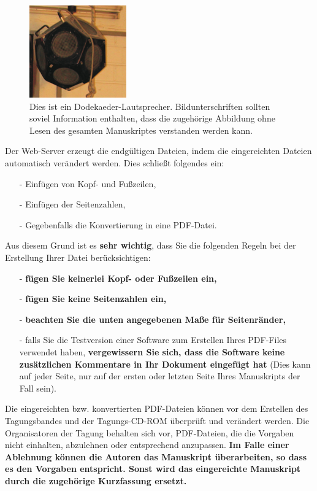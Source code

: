 \documentclass[a4paper, 10pt, twocolumn]{article}
\begin{document}
\begin{figure}[hbt]
    \begin{center}
        \includegraphics[width=4.2cm]{dode}
    \end{center}
    \caption{Dies ist ein Dodekaeder-Lautsprecher. Bildunterschriften sollten soviel Information enthalten, dass die zugehörige Abbildung ohne Lesen des gesamten Manuskriptes verstanden werden kann.}
    \label{fig:dode}
\end{figure}
Der Web-Server erzeugt die endgültigen Dateien, indem die eingereichten Dateien automatisch verändert werden. Dies schließt folgendes ein:
\begin{itemize}
    \item[-] Einfügen von Kopf- und Fußzeilen,
    \item[-] Einfügen der Seitenzahlen,
    \item[-] Gegebenfalls die Konvertierung in eine PDF-Datei.
\end{itemize}
Aus diesem Grund ist es \textbf{sehr wichtig}, dass Sie die folgenden Regeln bei der Erstellung Ihrer Datei berücksichtigen:
\begin{itemize}
    \item[-] \textbf{fügen Sie keinerlei Kopf- oder Fußzeilen ein,}
    \item[-] \textbf{fügen Sie keine Seitenzahlen ein,}
    \item[-] \textbf{beachten Sie die unten angegebenen Maße für Seitenränder,}
    \item[-] falls Sie die Testversion einer Software zum Erstellen Ihres PDF-Files verwendet haben, \textbf{vergewissern Sie sich, dass die Software keine
    zusätzlichen Kommentare in Ihr Dokument eingefügt hat} (Dies kann auf jeder Seite, nur auf der ersten oder letzten Seite Ihres Manuskripts der Fall
    sein).
\end{itemize}
Die eingereichten bzw. konvertierten PDF-Dateien können vor dem Erstellen des Tagungsbandes und der Tagungs-CD-ROM überprüft und verändert werden. Die Organisatoren der Tagung behalten sich vor, PDF-Dateien, die die Vorgaben nicht einhalten, abzulehnen oder entsprechend anzupassen. \textbf{Im Falle einer Ablehnung können die Autoren das Manuskript überarbeiten, so dass es den Vorgaben entspricht. Sonst wird das eingereichte Manuskript durch die zugehörige Kurzfassung ersetzt.}
\end{document}
